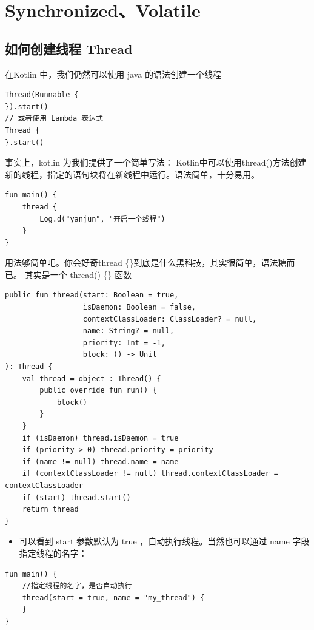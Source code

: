 \documentclass[9pt, b5paper]{article}
\begin{document}
\section{Synchronized、Volatile}
\label{sec-6}
\subsection{如何创建线程 Thread}
\label{sec-6-1}
在Kotlin 中，我们仍然可以使用 java 的语法创建一个线程
\begin{verbatim}
Thread(Runnable { 
}).start()
// 或者使用 Lambda 表达式
Thread {
}.start()
\end{verbatim}
事实上，kotlin 为我们提供了一个简单写法：
Kotlin中可以使用thread()方法创建新的线程，指定的语句块将在新线程中运行。语法简单，十分易用。
\begin{verbatim}
fun main() {
    thread {
        Log.d("yanjun", "开启一个线程")
    }
}
\end{verbatim}
用法够简单吧。你会好奇thread \{\}到底是什么黑科技，其实很简单，语法糖而已。 其实是一个 thread() \{\} 函数
\begin{verbatim}
public fun thread(start: Boolean = true,
                  isDaemon: Boolean = false,
                  contextClassLoader: ClassLoader? = null,
                  name: String? = null,
                  priority: Int = -1,
                  block: () -> Unit
): Thread {
    val thread = object : Thread() {
        public override fun run() {
            block()
        }
    }
    if (isDaemon) thread.isDaemon = true
    if (priority > 0) thread.priority = priority
    if (name != null) thread.name = name
    if (contextClassLoader != null) thread.contextClassLoader = contextClassLoader
    if (start) thread.start()   
    return thread
}
\end{verbatim}
\begin{itemize}
\item 可以看到 start 参数默认为 true ，自动执行线程。当然也可以通过 name 字段指定线程的名字：
\end{itemize}
\begin{verbatim}
fun main() {
    //指定线程的名字，是否自动执行
    thread(start = true, name = "my_thread") {
    }
}
\end{verbatim}
\end{document}
